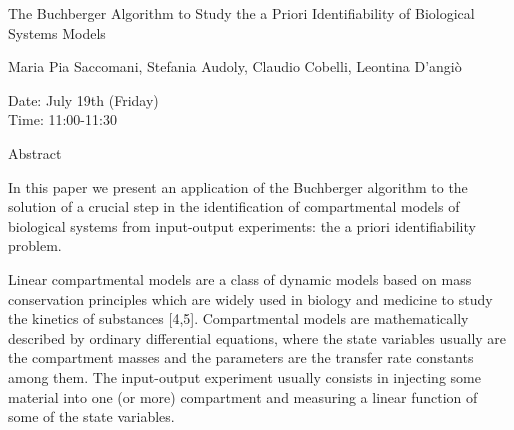 \begin{center}
\LARGE
The Buchberger Algorithm to Study the a
 Priori Identifiability of Biological Systems
                           Models
\end{center}

\begin{center}
\Large
Maria Pia Saccomani, Stefania Audoly, Claudio Cobelli, Leontina D'angi\`o
\end{center}

\noindent
Date:  July 19th (Friday)\\
Time:  11:00-11:30\\

\begin{center}
\large
Abstract
\end{center}

In this paper we present an application of the Buchberger algorithm to the solution of a crucial step
in the identification of compartmental models of biological systems from input-output
experiments: the a priori identifiability problem. 

Linear compartmental models are a class of dynamic models based on mass conservation principles
which are widely used in biology and medicine to study the kinetics of substances [4,5].
Compartmental models are mathematically described by ordinary differential equations, where the
state variables usually are the compartment masses and the parameters are the transfer rate
constants among them. The input-output experiment usually consists in injecting some material
into one (or more) compartment and measuring a linear function of some of the state variables. 

